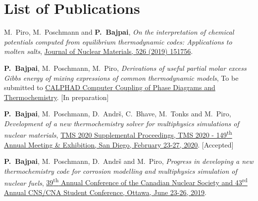 \chapter*{List of Publications}
\label{publications}

\begin{enumerate}{\small
\item {M.\ Piro}, {M.\ Poschmann} and \textbf{P.\ Bajpai}, \textit{On the interpretation of chemical potentials computed from equilibrium thermodynamic codes: Applications to molten salts}, \href{https://doi.org/10.1016/j.jnucmat.2019.151756}{Journal of Nuclear Materials, 526 (2019) 151756}.
\item \textbf{P.\ Bajpai}, {M.\ Poschmann}, {M.\ Piro}, \textit{Derivations of useful partial molar excess Gibbs energy of mixing expressions of common thermodynamic models}, To be submitted to \href{https://www.journals.elsevier.com/calphad}{CALPHAD Computer Coupling of Phase Diagrams and Thermochemistry}. [In preparation]
\item \textbf{P.\ Bajpai}, {M.\ Poschmann}, {D.\ Andr\v{s}}, {C.\ Bhave}, {M.\ Tonks} and {M.\ Piro}, \textit{Development of a new thermochemistry solver for multiphysics simulations of nuclear materials}, \href{http://https://www.tms.org/TMS2020}{TMS 2020 Supplemental Proceedings, TMS 2020  - 149\textsuperscript{th} Annual Meeting \& Exhibition, San Diego, February 23-27, 2020}. [Accepted]
\item \textbf{P.\ Bajpai}, {M.\ Poschmann}, {D.\ Andr\v{s}} and {M.\ Piro}, \textit{Progress in developing a new thermochemistry code for corrosion modelling and multiphysics simulation of nuclear fuels}, \href{http://cns-annual-conference.org/2019/index.html}{39\textsuperscript{th} Annual Conference of the Canadian Nuclear Society and 43\textsuperscript{rd} Annual CNS/CNA Student Conference, Ottawa, June 23-26, 2019}.
}\end{enumerate}


\newpage
\dedication{{M.\ Piro}, {M.\ Poschmann} and \textbf{P.\ Bajpai} \\ \textit{On the interpretation of chemical potentials computed from equilibrium thermodynamic codes: Applications to molten salts}\\ \href{https://doi.org/10.1016/j.jnucmat.2019.151756}{Journal of Nuclear Materials, 526 (2019) 151756}.}

